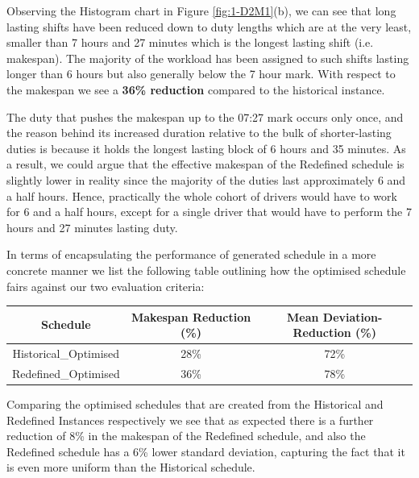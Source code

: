 \vspace{\baselineskip}
\noindent
Observing the Histogram chart in Figure \ref{fig:1-D2M1}(b), we can see that long lasting shifts have been reduced down to duty lengths which are at the very least, smaller than 7 hours and 27 minutes which is the longest lasting shift (i.e. makespan). The majority of the workload has been assigned to such shifts lasting longer than 6 hours but also generally below the 7 hour mark. With respect to the makespan we see a \textbf{36\% reduction} compared to the historical instance.

\vspace{\baselineskip}
\noindent
The duty that pushes the makespan up to the 07:27 mark occurs only once, and the reason behind its increased duration relative to the bulk of shorter-lasting duties is because it holds the longest lasting block of 6 hours and 35 minutes. As a result, we could argue that the effective makespan of the Redefined schedule is slightly lower in reality since the majority of the duties last approximately 6 and a half hours. Hence, practically the whole cohort of drivers would have to work for 6 and a half hours, except for a single driver that would have to perform the 7 hours and 27 minutes lasting duty.

\vspace{\baselineskip}
\noindent
In terms of encapsulating the performance of generated schedule in a more concrete manner we list the following table outlining how the optimised schedule fairs against our two evaluation criteria:


\begin{table}[h]
\small
    \centering 
\begin{tabular}{c|c|c}
        \textbf{Schedule} & \textbf{Makespan Reduction (\%)} & Mean Deviation-\textbf{Reduction (\%)} \\
        \hline
         Historical\_Optimised & 28\% & 72\% \\
        \hline
         Redefined\_Optimised  & 36\% & 78\% \\ 
\end{tabular}
\end{table}

\vspace{\baselineskip}
\noindent
Comparing the optimised schedules that are created from the Historical and Redefined Instances respectively we see that as expected there is a further reduction of 8\% in the makespan of the Redefined schedule, and also the Redefined schedule has a 6\% lower standard deviation, capturing the fact that it is even more uniform than the Historical schedule. 

